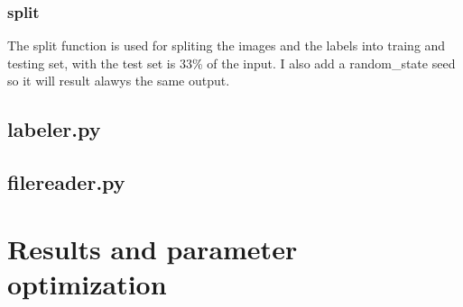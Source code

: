 \documentclass[11pt,a4paper,oneside]{report}
\begin{document}
\subsection{split}
The split function is used for spliting the images and the labels into traing and testing set, with the test set is 33\% of the input. I also add a random_state seed so it will result alawys the same output.

\section{labeler.py}

\section{filereader.py}

\chapter{Results and parameter optimization}
\end{document}
